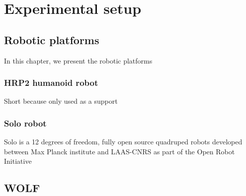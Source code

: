 \chapter{Experimental setup}
\minitoc


\section{Robotic platforms}

In this chapter, we present the robotic platforms

\subsection{HRP2 humanoid robot}
Short because only used as a support

\subsection{Solo robot}
Solo is a 12 degrees of freedom, fully open source quadruped robots developed between Max Planck institute and LAAS-CNRS as part of the Open Robot Initiative 
\cite{grimminger2020open} 

\section{WOLF}




